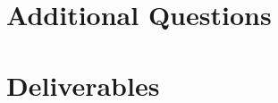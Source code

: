 \documentclass[main.tex]{subfiles}
\begin{document}
\section{Additional Questions}

\section{Deliverables}
\end{document}
